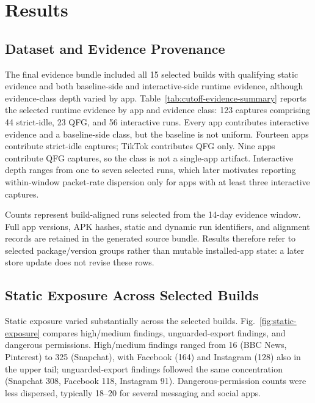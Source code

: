 \section{Results}

\subsection{Dataset and Evidence Provenance}

The final evidence bundle included all 15 selected builds with qualifying static evidence and both baseline-side and interactive-side runtime evidence, although evidence-class depth varied by app. Table~\ref{tab:cutoff-evidence-summary} reports the selected runtime evidence by app and evidence class: 123 captures comprising 44 strict-idle, 23 QFG, and 56 interactive runs. Every app contributes interactive evidence and a baseline-side class, but the baseline is not uniform. Fourteen apps contribute strict-idle captures; TikTok contributes QFG only. Nine apps contribute QFG captures, so the class is not a single-app artifact. Interactive depth ranges from one to seven selected runs, which later motivates reporting within-window packet-rate dispersion only for apps with at least three interactive captures.

Counts represent build-aligned runs selected from the 14-day evidence window. Full app versions, APK hashes, static and dynamic run identifiers, and alignment records are retained in the generated source bundle. Results therefore refer to selected package/version groups rather than mutable installed-app state: a later store update does not revise these rows.



\subsection{Static Exposure Across Selected Builds}

Static exposure varied substantially across the selected builds. Fig.~\ref{fig:static-exposure} compares high/medium findings, unguarded-export findings, and dangerous permissions. High/medium findings ranged from 16 (BBC News, Pinterest) to 325 (Snapchat), with Facebook (164) and Instagram (128) also in the upper tail; unguarded-export findings followed the same concentration (Snapchat 308, Facebook 118, Instagram 91). Dangerous-permission counts were less dispersed, typically 18--20 for several messaging and social apps.

